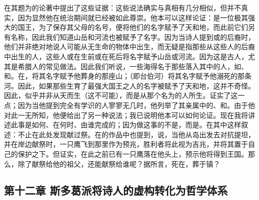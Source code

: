 在其题为的论著中提出了这些证据：这些说法确实与真相有几分相似，但并不真实，因为显然他在统治期间就已经被如此尊崇。他本可以这样论证：是一位极其强大的国王，为了保存其父母的名号，便将他们的名字赋予了天和地，而此前它们另有名称，因此我们知道山岳和河流也被赋予了名字。因为当诗人提到或的后裔时，他们并非绝对地说人可能从无生命的物体中出生，而无疑是指那些从这些人的后裔中出生的人，这些人或在生前或在死后将名字赋予山岳或河流。因为这是古人，尤其是希腊人的常见做法。因此我们听说，一些海得名于那些落入其中的人，如、和。在，将其名字赋予他葬身的那座山；（即台伯河）将其名字赋予他溺死的那条河。因此，如果那些生育了最强大国王之人的名字被赋予了天和地，这并不奇怪。因此，似乎并非从天而生（这不可能），而是从那个名为的人所生。证实了这一点；因为当他提到完全有学识的人寥寥无几时，他列举了其亲属中的、和。由于他对此一无所知，他便给出了另一种说法；我已说明他本可以如何论证。现在我将讲述此事是如何、在何时、由谁完成的；因为做这事的不是，而是。在其中这样叙述：不止在此处发现献过祭。在的作品中也提到，说，当他从岛出发去对抗提坦，并在岸边献祭时，一只鹰飞到那里作为预兆，胜利者将此视为吉兆，并将其置于自己的保护之下。但证实，在此之前已有一只鹰落在他头上，预示他将得到王国。那么，除了献祭给他的祖父，还能献祭给谁呢？据所言，死在，葬于镇？\par


\subsection{第十二章 斯多葛派将诗人的虚构转化为哲学体系}

